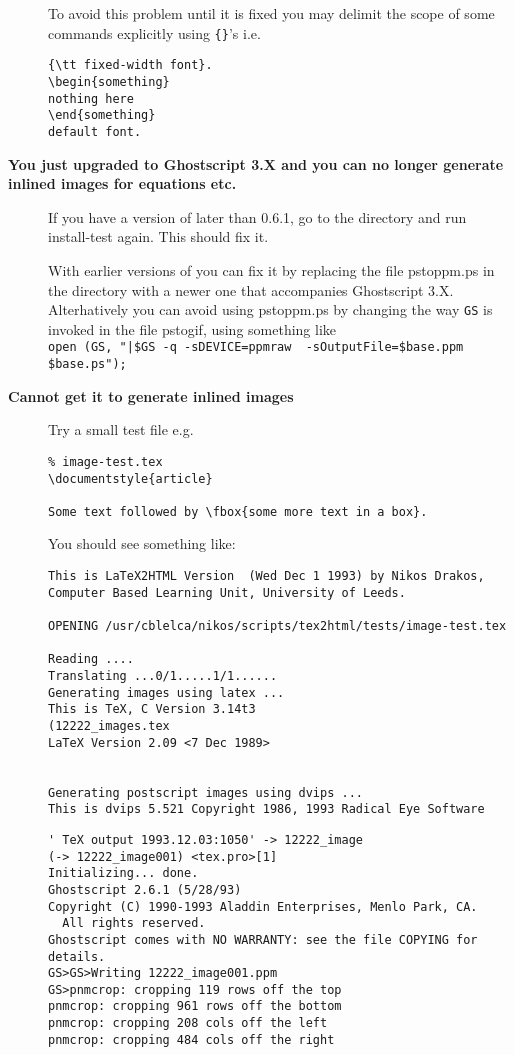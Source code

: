\begin{description}
To avoid this problem until it is fixed you may delimit the scope of
some
commands explicitly using \verb|{}|'s i.e.
\begin{verbatim}
{\tt fixed-width font}.
\begin{something}
nothing here
\end{something}
default font.
\end{verbatim}

\item [{\bf You just upgraded to {\fn Ghostscript 3.X} and you can no
longer generate inlined images for equations
etc.}]
If you have a version of \latextohtml later than 0.6.1, go to the
\latextohtml directory and run {\fn install-test} again. This should 
fix it.

With earlier versions of \latextohtml you can fix it by 
replacing the file {\fn pstoppm.ps} in the 
\latextohtml directory with a newer one that accompanies 
{\fn Ghostscript 3.X}. Alterhatively you can avoid using {\fn
pstoppm.ps} 
by changing the way {\tt GS} is invoked in the file {\fn pstogif},
using something like \\
\verb/open (GS, "|$GS -q -sDEVICE=ppmraw  -sOutputFile=$base.ppm $base.ps");/

\item [{\bf Cannot get it to generate inlined images}]
Try a small test file e.g.
\begin{verbatim}
% image-test.tex
\documentstyle{article}

Some text followed by \fbox{some more text in a box}.

\end{verbatim}

You should see something like:
\begin{verbatim}
This is LaTeX2HTML Version  (Wed Dec 1 1993) by Nikos Drakos, 
Computer Based Learning Unit, University of Leeds.

OPENING /usr/cblelca/nikos/scripts/tex2html/tests/image-test.tex 

Reading ....
Translating ...0/1.....1/1......
Generating images using latex ...
This is TeX, C Version 3.14t3
(12222_images.tex
LaTeX Version 2.09 <7 Dec 1989>


Generating postscript images using dvips ...
This is dvips 5.521 Copyright 1986, 1993 Radical Eye Software
\end{verbatim}
\begin{verbatim}
' TeX output 1993.12.03:1050' -> 12222_image
(-> 12222_image001) <tex.pro>[1] 
Initializing... done.
Ghostscript 2.6.1 (5/28/93)
Copyright (C) 1990-1993 Aladdin Enterprises, Menlo Park, CA.
  All rights reserved.
Ghostscript comes with NO WARRANTY: see the file COPYING for details.
GS>GS>Writing 12222_image001.ppm
GS>pnmcrop: cropping 119 rows off the top
pnmcrop: cropping 961 rows off the bottom
pnmcrop: cropping 208 cols off the left
pnmcrop: cropping 484 cols off the right


\end{verbatim}
\end{description}
